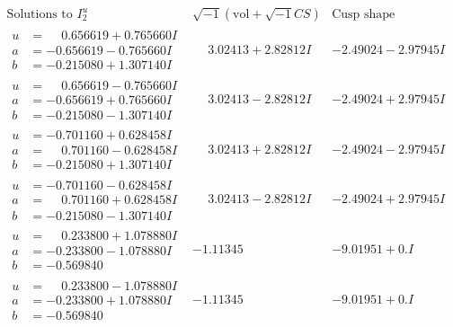 \documentclass[1p]{elsarticle_modified}
\theoremstyle{definition}
\newcommand{\I}{\sqrt{-1}}
\begin{document}
$$\begin{array}{c|c|c}  
\text{Solutions to }I^u_{2}& \I (\text{vol} + \sqrt{-1}CS) & \text{Cusp shape}\\
 \hline 
\begin{aligned}
u &= \phantom{-}0.656619 + 0.765660 I \\
a &= -0.656619 - 0.765660 I \\
b &= -0.215080 + 1.307140 I\end{aligned}
 & \phantom{-}3.02413 + 2.82812 I & -2.49024 - 2.97945 I \\ \hline\begin{aligned}
u &= \phantom{-}0.656619 - 0.765660 I \\
a &= -0.656619 + 0.765660 I \\
b &= -0.215080 - 1.307140 I\end{aligned}
 & \phantom{-}3.02413 - 2.82812 I & -2.49024 + 2.97945 I \\ \hline\begin{aligned}
u &= -0.701160 + 0.628458 I \\
a &= \phantom{-}0.701160 - 0.628458 I \\
b &= -0.215080 + 1.307140 I\end{aligned}
 & \phantom{-}3.02413 + 2.82812 I & -2.49024 - 2.97945 I \\ \hline\begin{aligned}
u &= -0.701160 - 0.628458 I \\
a &= \phantom{-}0.701160 + 0.628458 I \\
b &= -0.215080 - 1.307140 I\end{aligned}
 & \phantom{-}3.02413 - 2.82812 I & -2.49024 + 2.97945 I \\ \hline\begin{aligned}
u &= \phantom{-}0.233800 + 1.078880 I \\
a &= -0.233800 - 1.078880 I \\
b &= -0.569840\phantom{ +0.000000I}\end{aligned}
 & -1.11345\phantom{ +0.000000I} & -9.01951 + 0. I\phantom{ +0.000000I} \\ \hline\begin{aligned}
u &= \phantom{-}0.233800 - 1.078880 I \\
a &= -0.233800 + 1.078880 I \\
b &= -0.569840\phantom{ +0.000000I}\end{aligned}
 & -1.11345\phantom{ +0.000000I} & -9.01951 + 0. I\phantom{ +0.000000I} \\ \hline\begin{aligned}

\end{aligned}
\end{array}$$
\end{document}
